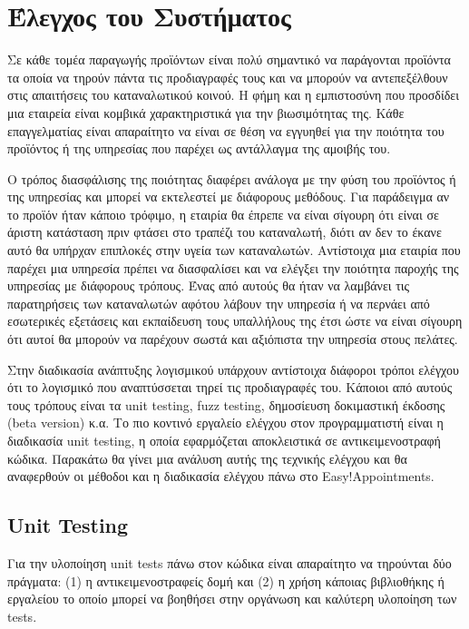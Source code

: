 \chapter{Έλεγχος του Συστήματος}
Σε κάθε τομέα παραγωγής προϊόντων είναι πολύ σημαντικό να παράγονται προϊόντα τα οποία να τηρούν πάντα τις προδιαγραφές τους και να μπορούν να αντεπεξέλθουν στις απαιτήσεις του καταναλωτικού κοινού. Η φήμη και η εμπιστοσύνη που προσδίδει μια εταιρεία είναι κομβικά χαρακτηριστικά για την βιωσιμότητας της. Κάθε επαγγελματίας είναι απαραίτητο να είναι σε θέση να εγγυηθεί για την ποιότητα του προϊόντος ή της υπηρεσίας που παρέχει ως αντάλλαγμα της αμοιβής του.

Ο τρόπος διασφάλισης της ποιότητας διαφέρει ανάλογα με την φύση του προϊόντος ή της υπηρεσίας και μπορεί να εκτελεστεί με διάφορους μεθόδους. Για παράδειγμα αν το προϊόν ήταν κάποιο τρόφιμο, η εταιρία θα έπρεπε να είναι σίγουρη ότι είναι σε άριστη κατάσταση πριν φτάσει στο τραπέζι του καταναλωτή, διότι αν δεν το έκανε αυτό θα υπήρχαν επιπλοκές στην υγεία των καταναλωτών. Αντίστοιχα μια εταιρία που παρέχει μια υπηρεσία πρέπει να διασφαλίσει και να ελέγξει την ποιότητα παροχής της υπηρεσίας με διάφορους τρόπους. Ένας από αυτούς θα ήταν να λαμβάνει τις παρατηρήσεις των καταναλωτών αφότου λάβουν την υπηρεσία ή να περνάει από εσωτερικές εξετάσεις και εκπαίδευση τους υπαλλήλους της έτσι ώστε να είναι σίγουρη ότι αυτοί θα μπορούν να παρέχουν σωστά και αξιόπιστα την υπηρεσία στους πελάτες.

Στην διαδικασία ανάπτυξης λογισμικού υπάρχουν αντίστοιχα διάφοροι τρόποι ελέγχου ότι το λογισμικό που αναπτύσσεται τηρεί τις προδιαγραφές του. Κάποιοι από αυτούς τους τρόπους είναι τα unit testing, fuzz testing, δημοσίευση δοκιμαστική έκδοσης (beta version) κ.α. Το πιο κοντινό εργαλείο ελέγχου στον προγραμματιστή είναι η διαδικασία unit testing, η οποία εφαρμόζεται αποκλειστικά σε αντικειμενοστραφή κώδικα. Παρακάτω θα γίνει μια ανάλυση αυτής της τεχνικής ελέγχου και θα αναφερθούν οι μέθοδοι και η διαδικασία ελέγχου πάνω στο Easy!Appointments.

\section {Unit Testing}
Για την υλοποίηση unit tests πάνω στον κώδικα είναι απαραίτητο να τηρούνται δύο πράγματα: (1) η αντικειμενοστραφείς δομή και (2) η χρήση κάποιας βιβλιοθήκης ή εργαλείου το οποίο μπορεί να βοηθήσει στην οργάνωση και καλύτερη υλοποίηση των tests.

